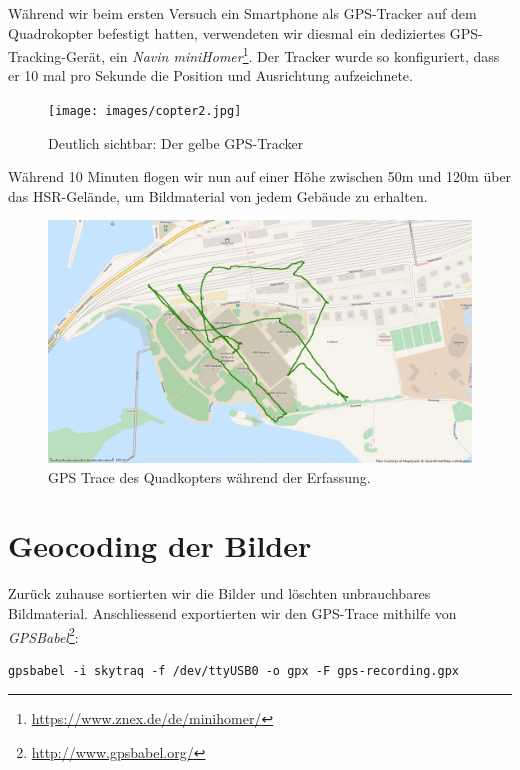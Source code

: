 \noindent Während wir beim ersten Versuch ein Smartphone als GPS-Tracker auf dem
Quadrokopter befestigt hatten, verwendeten wir diesmal ein dediziertes
GPS-Tracking-Gerät, ein \textit{Navin
miniHomer}\footnote{\url{https://www.znex.de/de/minihomer/}}. Der Tracker wurde
so konfiguriert, dass er 10 mal pro Sekunde die Position und Ausrichtung
aufzeichnete.
\begin{figure}[H]
	\centering
	\texttt{[image: images/copter2.jpg]}
	\caption{Deutlich sichtbar: Der gelbe GPS-Tracker}
	\label{img:copter2}
\end{figure}

\noindent Während 10 Minuten flogen wir nun auf einer Höhe zwischen 50m und 120m
über das HSR-Gelände, um Bildmaterial von jedem Gebäude zu erhalten.
\begin{figure}[H]
	\centering
	\includegraphics[width=\textwidth]{images/gpstrace_hsr_mapquest}
	\caption{GPS Trace des Quadkopters während der Erfassung.}
	\label{img:gpstrace_hsr_mapquest}
\end{figure}


\section{Geocoding der Bilder}

\label{workflow:hsr:geocoding}

Zurück zuhause sortierten wir die Bilder und löschten unbrauchbares
Bildmaterial. Anschliessend exportierten wir den GPS-Trace mithilfe von
\textit{GPSBabel}\footnote{\url{http://www.gpsbabel.org/}}:

\vspace{0.5\baselineskip}
\begin{verbatim} 
gpsbabel -i skytraq -f /dev/ttyUSB0 -o gpx -F gps-recording.gpx
\end{verbatim}

